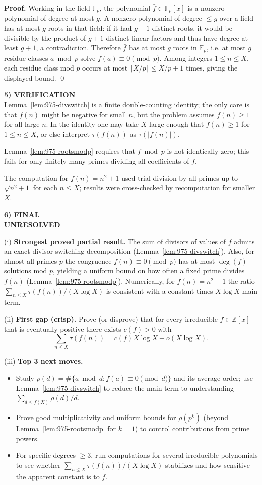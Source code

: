 \noindent\textbf{Proof.}
Working in the field $\mathbb{F}_p$, the polynomial $\bar f\in\mathbb{F}_p[x]$ is a nonzero polynomial of degree at most $g$.  A nonzero polynomial of degree $\le g$ over a field has at most $g$ roots in that field: if it had $g+1$ distinct roots, it would be divisible by the product of $g+1$ distinct linear factors and thus have degree at least $g+1$, a contradiction.
Therefore $\bar f$ has at most $g$ roots in $\mathbb{F}_p$, i.e. at most $g$ residue classes $a\bmod p$ solve $f(a)\equiv 0\pmod p$.
Among integers $1\le n\le X$, each residue class mod $p$ occurs at most $\lceil X/p\rceil\le X/p+1$ times, giving the displayed bound. \qed

\medskip
\noindent\textbf{5) VERIFICATION}\\
Lemma~\ref{lem:975-divswitch} is a finite double-counting identity; the only care is that $f(n)$ might be negative for small $n$, but the problem assumes $f(n)\ge 1$ for all large $n$.  In the identity one may take $X$ large enough that $f(n)\ge 1$ for $1\le n\le X$, or else interpret $\tau(f(n))$ as $\tau(|f(n)|)$.

Lemma~\ref{lem:975-rootsmodp} requires that $f\bmod p$ is not identically zero; this fails for only finitely many primes dividing all coefficients of $f$.

The computation for $f(n)=n^2+1$ used trial division by all primes up to $\sqrt{n^2+1}$ for each $n\le X$; results were cross-checked by recomputation for smaller $X$.

\medskip
\noindent\textbf{6) FINAL}\\
\textbf{UNRESOLVED}

(i) \textbf{Strongest proved partial result.} The sum of divisors of values of $f$ admits an exact divisor-switching decomposition (Lemma~\ref{lem:975-divswitch}).  Also, for almost all primes $p$ the congruence $f(n)\equiv 0\pmod p$ has at most $\deg(f)$ solutions mod $p$, yielding a uniform bound on how often a fixed prime divides $f(n)$ (Lemma~\ref{lem:975-rootsmodp}).  Numerically, for $f(n)=n^2+1$ the ratio $\sum_{n\le X}\tau(f(n))/(X\log X)$ is consistent with a constant-times-$X\log X$ main term.

(ii) \textbf{First gap (crisp).} Prove (or disprove) that for every irreducible $f\in\mathbb{Z}[x]$ that is eventually positive there exists $c(f)>0$ with
\[
\sum_{n\le X}\tau(f(n)) = c(f)X\log X + o(X\log X).
\]

(iii) \textbf{Top 3 next moves.}
\begin{itemize}
\item Study $\rho(d)=\#\{a\bmod d: f(a)\equiv 0\pmod d\}$ and its average order; use Lemma~\ref{lem:975-divswitch} to reduce the main term to understanding $\sum_{d\le f(X)} \rho(d)/d$.
\item Prove good multiplicativity and uniform bounds for $\rho(p^k)$ (beyond Lemma~\ref{lem:975-rootsmodp} for $k=1$) to control contributions from prime powers.
\item For specific degrees $\ge 3$, run computations for several irreducible polynomials to see whether $\sum_{n\le X}\tau(f(n))/(X\log X)$ stabilizes and how sensitive the apparent constant is to $f$.
\end{itemize}

